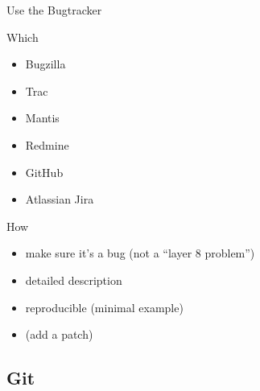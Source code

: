 \documentclass{beamer}
\begin{document}
\begin{frame}{Use the Bugtracker}
    \begin{block}{Which}
        \begin{itemize}
            \item Bugzilla
            \item Trac
            \item Mantis
            \item Redmine
            \item GitHub
            \item Atlassian Jira
        \end{itemize}
    \end{block}
    \pause
    \begin{block}{How}
        \begin{itemize}
            \item make sure it's a bug (not a \enquote{layer 8 problem})
            \item detailed description
            \item reproducible (minimal example)
            \item (add a patch)
        \end{itemize}
    \end{block}
\end{frame}

\subsection{Git}
\end{document}
